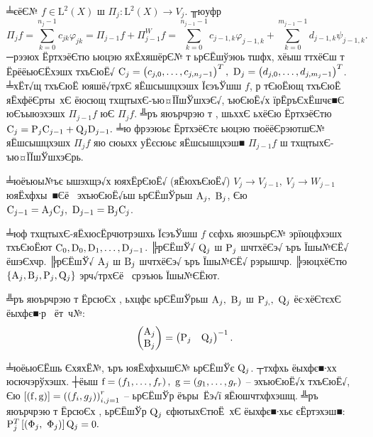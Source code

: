 \documentclass[12pt, a4paper, oneside]{article}
\begin{document}
╧єёЄ№ $f\in \mathrm{L}^{2} (X)$ ш $\Pi _{j} : \mathrm{L}^{2} (X)\to V_{j} $. ╥юуфр
\[
\Pi _{j} f=\sum _{k=0}^{n_{j} -1}c_{jk} \varphi _{jk}  =\Pi _{j-1} f+\Pi _{j-1}^{W} f=\sum _{k=0}^{n_{j-1} -1}c_{j-1,k} \varphi _{j-1,k}  +\sum _{k=0}^{m_{j-1} -1}d_{j-1,k} \psi _{j-1,k}.
\]
─рээюх ЁртхэёЄтю ьюцэю яхЁхяшёрЄ№ т ьрЄЁшўэюь тшфх, хёыш ттхёЄш т ЁрёёьюЄЁхэшх тхъЄюЁ√ ${\rm C}_{j} =\left(c_{j,0} ,\dots,c_{j,n_{j} -1} \right)^{T} ,~{\rm D}_{j} =\left(d_{j,0} ,\dots,d_{j,m_{j} -1} \right)^{T} $. ╧хЁт√щ тхъЄюЁ юяшё√трхЄ яЁшсышцхэшх ЇєэъЎшш $f$, р тЄюЁющ тхъЄюЁ яЁхфёЄрты хЄ ёюсющ тхщтыхЄ-ъю¤ЇЇшЎшхэЄ√, ъюЄюЁ√х їрЁръЄхЁшчє■Є юЄъыюэхэшх $\Pi _{j-1} f$ юЄ $\Pi _{j} f$. ╩ръ яюърчрэю т \cite{ArticleFinkelstein}, шьххЄ ьхёЄю ЁртхэёЄтю
${\rm C}_{j} ={\rm P}_{j} {\rm C}_{j-1} +{\rm Q}_{j} {\rm D}_{j-1} .$
╧ю фрээюьє ЁртхэёЄтє ьюцэю тюёёЄрэютшЄ№ яЁшсышцхэшх $\Pi _{j} f$ яю сюыхх уЁєсюьє яЁшсышцхэш■ $\Pi _{j-1} f$ ш тхщтыхЄ-ъю¤ЇЇшЎшхэЄрь.
 \par ╧юёъюы№ъє ышэхщэ√х юяхЁрЄюЁ√ (яЁюхъЄюЁ√) $V_{j} \to V_{j-1} ,~V_{j} \to W_{j-1} $ юяЁхфхы ■Єё  эхъюЄюЁ√ьш ьрЄЁшЎрьш ${\rm A}_{j},~{\rm B}_{j} $, Єю ${\rm C}_{j-1} ={\rm A}_{j} {\rm C}_{j},~{\rm D}_{j-1} ={\rm B}_{j} {\rm C}_{j} $.
\par ╧юф тхщтыхЄ-яЁхюсЁрчютрэшхь ЇєэъЎшш $f$ сєфхь яюэшьрЄ№ эрїюцфхэшх тхъЄюЁют ${\rm C}_{0} ,{\rm D}_{0} ,{\rm D}_{1} ,\dots,{\rm D}_{j-1} $. ╠рЄЁшЎ√ ${\rm Q}_j$ ш ${\rm P}_j$ шчтхёЄэ√ ъръ Їшы№ЄЁ√ ёшэЄхчр. ╠рЄЁшЎ√ ${\rm A}_j$ ш ${\rm B}_j$ шчтхёЄэ√ ъръ Їшы№ЄЁ√ рэрышчр. ╠эюцхёЄтю $\{{\rm A}_j, {\rm B}_j, {\rm P}_j, {\rm Q}_j\}$ эрч√трхЄё  срэъюь Їшы№ЄЁют.
\par ╩ръ яюърчрэю т ЁрсюЄх  \cite{ArticleFinkelstein}, ьхцфє ьрЄЁшЎрьш ${\rm A}_{j},~{\rm B}_{j}$ ш ${\rm P}_{j,},~{\rm Q}_{j} $ ёє∙хёЄтєхЄ ёыхфє■∙р  ёт ч№:
\[
\begin{pmatrix} {\rm A}_{j} \\ {\rm B}_{j} \end{pmatrix}=\begin{pmatrix} {\rm P}_{j}& {\rm Q}_{j}\end{pmatrix}^{-1}.
\]
\par ╧юёьюЄЁшь ЄхяхЁ№, ъръ юяЁхфхышЄ№ ьрЄЁшЎє ${\rm Q}_{j} $. ┬тхфхь ёыхфє■∙хх юсючэрўхэшх. ┼ёыш ${\rm f}=\left(f_{1} ,\dots, f_{r} \right),~{\rm g}=\left(g_{1} ,\dots,g_{r} \right)$ -- эхъюЄюЁ√х тхъЄюЁ√, Єю $[({\rm f},{\rm g})]=\left(\left(f_{i} ,g_{j} \right)\right)_{i,j=1}^{r} $ -- ьрЄЁшЎр ёъры Ёэ√ї яЁюшчтхфхэшщ.  ╩ръ яюърчрэю т ЁрсюЄх  \cite{ArticleFinkelstein}, ьрЄЁшЎр ${\rm Q}_{j} $ єфютыхЄтюЁ хЄ ёыхфє■∙хьє єЁртэхэш■: ${\rm P}_{j}^{T} \left[\left(\Phi _{j},~\Phi _{j} \right)\right]{\rm Q}_{j} =0.$
\end{document}

